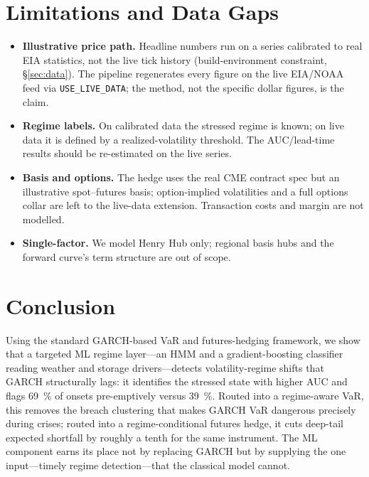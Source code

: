 \documentclass[11pt]{article}
\begin{document}
\section{Limitations and Data Gaps}
\begin{itemize}[leftmargin=1.4em,itemsep=0.15em]
\item \textbf{Illustrative price path.} Headline numbers run on a series calibrated
to real EIA statistics, not the live tick history (build-environment constraint,
\S\ref{sec:data}). The pipeline regenerates every figure on the live EIA/NOAA feed
via \texttt{USE\_LIVE\_DATA}; the method, not the specific dollar figures, is the
claim.
\item \textbf{Regime labels.} On calibrated data the stressed regime is known; on
live data it is defined by a realized-volatility threshold. The AUC/lead-time
results should be re-estimated on the live series.
\item \textbf{Basis and options.} The hedge uses the real CME contract spec but an
illustrative spot--futures basis; option-implied volatilities and a full options
collar are left to the live-data extension. Transaction costs and margin are not
modelled.
\item \textbf{Single-factor.} We model Henry Hub only; regional basis hubs and the
forward curve's term structure are out of scope.
\end{itemize}

\section{Conclusion}
Using the standard GARCH-based VaR and futures-hedging framework, we show that a
targeted ML regime layer---an HMM and a gradient-boosting classifier reading weather
and storage drivers---detects volatility-regime shifts that GARCH structurally lags:
it identifies the stressed state with higher AUC and flags \SI{69}{\percent} of
onsets pre-emptively versus \SI{39}{\percent}. Routed into a regime-aware VaR, this
removes the breach clustering that makes GARCH VaR dangerous precisely during
crises; routed into a regime-conditional futures hedge, it cuts deep-tail expected
shortfall by roughly a tenth for the same instrument. The ML component earns its
place not by replacing GARCH but by supplying the one input---timely regime
detection---that the classical model cannot.

\small
\end{document}
